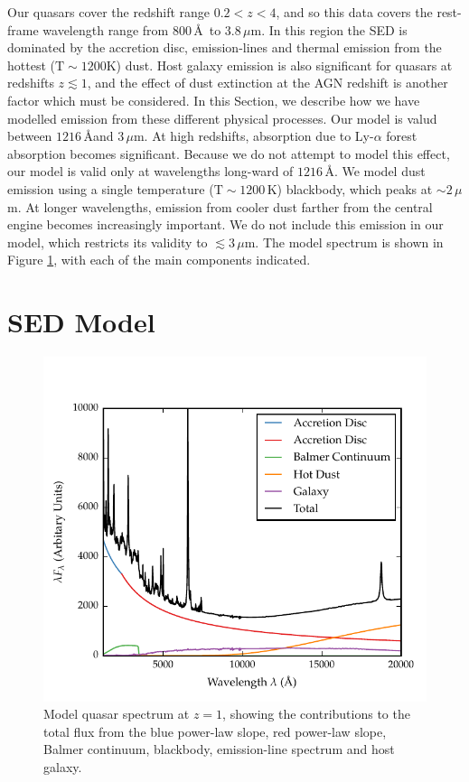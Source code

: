 Our quasars cover the redshift range $0.2 < z < 4$, and so this data covers the rest-frame wavelength range from $800$\,\AA\, to $3.8$\,$\mu$m. 
In this region the SED is dominated by the accretion disc, emission-lines and thermal emission from the hottest (${\mathrm T}\sim1200$K) dust. 
Host galaxy emission is also significant for quasars at redshifts $z\lesssim1$, and the effect of dust extinction at the AGN redshift is another factor which must be considered.   
In this Section, we describe how we have modelled emission from these different physical processes.
Our model is valud between $1216$\,\AA and $3$\,$\mu$m.
At high redshifts, absorption due to Ly-$\alpha$ forest absorption becomes significant. 
Because we do not attempt to model this effect, our model is valid only at wavelengths long-ward of $1216$\,\AA. 
We model dust emission using a single temperature (${\mathrm T}\sim1200$\,K) blackbody, which peaks at $\sim2$\,$\mu$m. 
At longer wavelengths, emission from cooler dust farther from the central engine becomes increasingly important. 
We do not include this emission in our model, which restricts its validity to $\lesssim3$\,$\mu$m.
The model spectrum is shown in Figure \ref{fig:modelsed}, with each of the main components indicated. 

\section{SED Model}

\begin{figure}[h!]
  \centering
  \includegraphics[width=\textwidth]{figures/chapter05/sed_model.pdf}
  \caption[{Model quasar spectrum at $z=1$, showing the contributions to the total flux from the blue power-law slope, red power-law slope, Balmer continuum, blackbody, emission-line spectrum and host galaxy.}]{Model quasar spectrum at $z=1$, showing the contributions to the total flux from the blue power-law slope, red power-law slope, Balmer continuum, blackbody, emission-line spectrum and host galaxy. }
  \label{fig:modelsed}
\end{figure}


